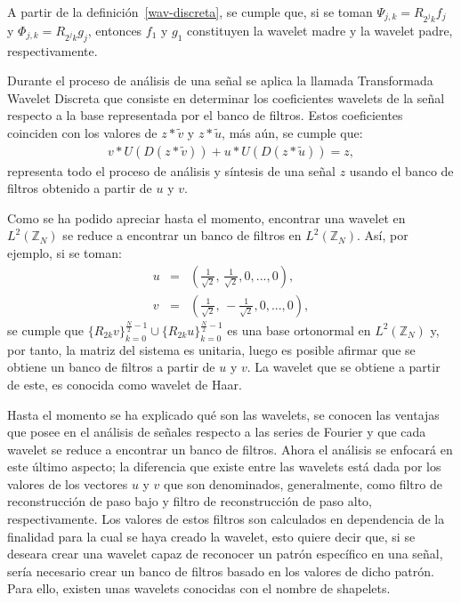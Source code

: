 \par A partir de la definici\'on~\ref{wav-discreta}, se cumple que, si se toman $\Psi_{j,k}=R_{2^jk}f_j$ y $\Phi_{j,k}=R_{2^jk}g_j$, entonces $f_1$ y $g_1$ constituyen la wavelet madre y la wavelet padre, respectivamente.\\

\par Durante el proceso de an\'alisis de una se\~nal se aplica la llamada Transformada Wavelet Discreta que consiste en determinar los coeficientes wavelets de la se\~nal respecto a la base representada por el banco de filtros. Estos coeficientes coinciden con los valores de $z\ast\tilde{v}$ y $z\ast\tilde{u}$, m\'as a\'un, se cumple que:
\begin{eqnarray}
v\ast U(D(z\ast\tilde{v}))+u\ast U(D(z\ast\tilde{u}))=z,\nonumber
\end{eqnarray}
representa todo el proceso de an\'alisis y s\'intesis de una se\~nal $z$ usando el banco de filtros obtenido a partir de $u$ y $v$.\\

\par Como se ha podido apreciar hasta el momento, encontrar una wavelet en $L^2\left(\mathbb{Z}_N\right)$ se reduce a encontrar un banco de filtros en $L^2\left(\mathbb{Z}_N\right)$. As\'i, por ejemplo, si se toman:
\begin{eqnarray}
u&=&\left(\frac{1}{\sqrt{2}},\,\frac{1}{\sqrt{2}},0,...,0\right),\nonumber\\
v&=&\left(\frac{1}{\sqrt{2}},\,-\frac{1}{\sqrt{2}},0,...,0\right),\nonumber
\end{eqnarray}
se cumple que $\{R_{2k}v\}_{k=0}^{\frac{N}{2}-1}\cup\{R_{2k}u\}_{k=0}^{\frac{N}{2}-1}$ es una base ortonormal en $L^2\left(\mathbb{Z}_N\right)$ y, por tanto, la matriz del sistema es unitaria, luego es posible afirmar que se obtiene un banco de filtros a partir de $u$ y $v$. La wavelet que se obtiene a partir de este, es conocida como wavelet de Haar.\\

\par Hasta el momento se ha explicado qu\'e son las wavelets, se conocen las ventajas que posee en el an\'alisis de se\~nales respecto a las series de Fourier y que cada wavelet se reduce a encontrar un banco de filtros. Ahora el an\'alisis se enfocar\'a en este \'ultimo aspecto; la diferencia que existe entre las wavelets est\'a dada por los valores de los vectores $u$ y $v$ que son denominados, generalmente, como filtro de reconstrucci\'on de paso bajo y filtro de reconstrucci\'on de paso alto, respectivamente. Los valores de estos filtros son calculados en dependencia de la finalidad para la cual se haya creado la wavelet, esto quiere decir que, si se deseara crear una wavelet capaz de reconocer un patr\'on espec\'ifico en una se\~nal, ser\'ia necesario crear un banco de filtros basado en los valores de dicho patr\'on. Para ello, existen unas wavelets conocidas con el nombre de shapelets.\\


